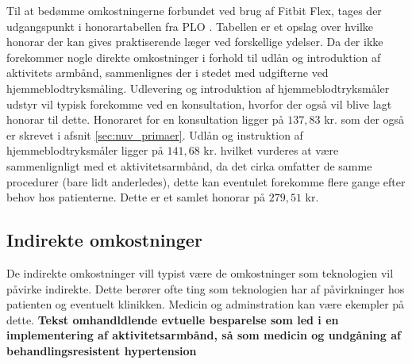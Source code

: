 Til at bedømme omkostningerne forbundet ved brug af Fitbit Flex, tages der udgangspunkt i honorartabellen fra PLO \citep{honorartabel2016}. Tabellen er et opslag over hvilke honorar der kan gives praktiserende læger ved forskellige ydelser.
Da der ikke forekommer nogle direkte omkostninger i forhold til udlån og introduktion af aktivitets armbånd, sammenlignes der i stedet med udgifterne ved hjemmeblodtryksmåling. Udlevering og introduktion af hjemmeblodtryksmåler udstyr vil typisk forekomme ved en konsultation, hvorfor der også vil blive lagt honorar til dette. Honoraret for en konsultation ligger på $137,83$ kr. som der også er skrevet i afsnit \autoref{sec:nuv_primaer}. Udlån og instruktion af hjemmeblodtryksmåler ligger på $141,68$ kr. hvilket vurderes at være sammenlignligt med et aktivitetsarmbånd, da det cirka omfatter de samme procedurer (bare lidt anderledes), dette kan eventulet forekomme flere gange efter behov hos patienterne. Dette er et samlet honorar på $279,51$ kr.

\subsection{Indirekte omkostninger}
De indirekte omkostninger vill typist være de omkostninger som teknologien vil påvirke indirekte. Dette berører ofte ting som teknologien har af påvirkninger hos patienten og eventuelt klinikken. Medicin og adminstration kan være ekempler på dette. 
\textbf{Tekst omhandldlende evtuelle besparelse som led i en implementering af aktivitetsarmbånd, så som medicin og undgåning af behandlingsresistent hypertension}













\begin{comment}
Hvad koster et Fitbit Flex? 
Hvilke besparelser tilbydes der så sundhedsektoren? 

Hvad koster det så at introducere patienterne til teknologien? 
	Hvad dækker den her introduktion minimum over, for at kunne anvende armbåndet? (Anvendelse af app og hvordan den skal oplades.)
	
Hvad koster det hvis de har spørgsmål vedr. teknologien? 


Langsigtet omkostninger - hvis behandlingen hjælper/ikke hjælper
- Besparelser vedr. medicinering 
- Besparelser vedr. ambulant forløb 
- Forebyggelse af behandlingsresistent hypertension = $$$$



EVT: Dags-takster i sekundær sektor (Ambulant).



En model i almen praktsis for implementeringen af aktivitetsarmbånd?

Honorartabel = \citep{honorartabel2016}
\end{comment}
